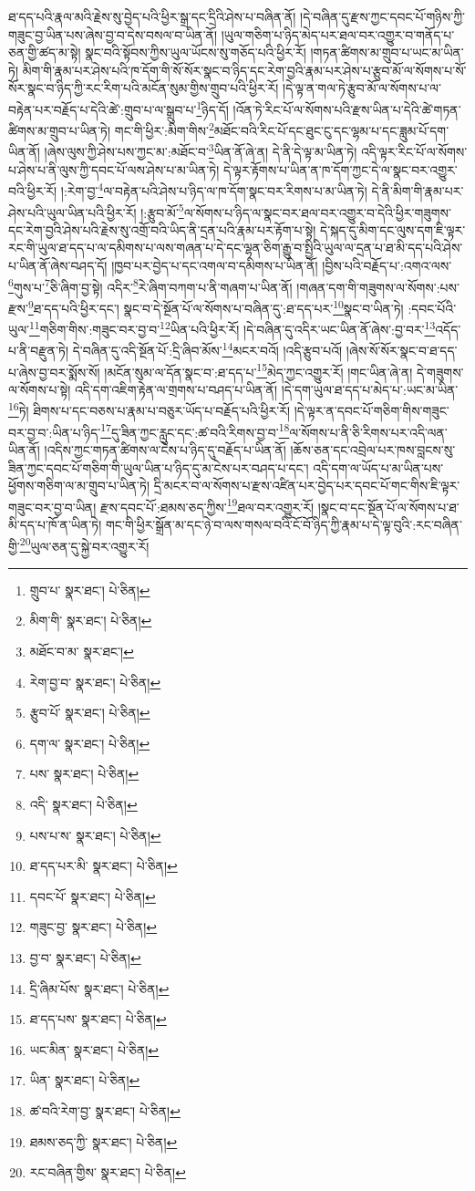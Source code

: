 ཐ་དད་པའི་རྣལ་མའི་རྗེས་སུ་བྱེད་པའི་ཕྱིར་སྒྲ་དང་དྲིའི་ཤེས་པ་བཞིན་ནོ། །དེ་བཞིན་དུ་རྫས་ཀྱང་དབང་པོ་གཉིས་ཀྱི་གཟུང་བྱ་ཡིན་པས་ཞེས་བྱ་བ་དེས་བསལ་བ་ཡིན་ནོ། །ཡུལ་གཅིག་པ་ཉིད་མེད་པར་ཐལ་བར་འགྱུར་བ་གནོད་པ་ཅན་གྱི་ཚད་མ་སྟེ། སྣང་བའི་སྟོབས་ཀྱིས་ཡུལ་ཡོངས་སུ་གཅོད་པའི་ཕྱིར་རོ། །གཏན་ཚིགས་མ་གྲུབ་པ་ཡང་མ་ཡིན་ཏེ། མིག་གི་རྣམ་པར་ཤེས་པའི་ཁ་དོག་གི་སོ་སོར་སྣང་བ་ཉིད་དང་རེག་བྱའི་རྣམ་པར་ཤེས་པ་རྩུབ་མོ་ལ་སོགས་པ་སོ་སོར་སྣང་བ་ཉིད་ཀྱི་རང་རིག་པའི་མངོན་སུམ་གྱིས་གྲུབ་པའི་ཕྱིར་རོ། །དེ་ལྟ་ན་གལ་ཏེ་རྩུབ་མོ་ལ་སོགས་པ་ལ་བརྟེན་པར་བརྗོད་པ་དེའི་ཚེ་:གྲུབ་པ་ལ་སྒྲུབ་པ་\footnote{གྲུབ་པ་  སྣར་ཐང་།  པེ་ཅིན། }ཉིད་དོ། །འོན་ཏེ་རིང་པོ་ལ་སོགས་པའི་རྫས་ཡིན་པ་དེའི་ཚེ་གཏན་ཚིགས་མ་གྲུབ་པ་ཡིན་ཏེ། གང་གི་ཕྱིར་:མིག་གིས་\footnote{མིག་གི་  སྣར་ཐང་།  པེ་ཅིན། }མཐོང་བའི་རིང་པོ་དང་ཐུང་ངུ་དང་ལྷམ་པ་དང་ཟླུམ་པོ་དག་ཡིན་ནོ། །ཞེས་ལུས་ཀྱི་ཤེས་པས་ཀྱང་མ་:མཐོང་བ་\footnote{མཐོང་བ་མ་  སྣར་ཐང་། }ཡིན་ནོ་ཞེ་ན། དེ་ནི་དེ་ལྟ་མ་ཡིན་ཏེ། འདི་ལྟར་རིང་པོ་ལ་སོགས་པ་ཤེས་པ་ནི་ལུས་ཀྱི་དབང་པོ་ལས་ཤེས་པ་མ་ཡིན་ཏེ། དེ་ལྟར་རྟོགས་པ་ཡིན་ན་ཁ་དོག་ཀྱང་དེ་ལ་སྣང་བར་འགྱུར་བའི་ཕྱིར་རོ། །:རེག་བྱ་\footnote{རེག་བྱ་བ་  སྣར་ཐང་།  པེ་ཅིན། }ལ་བརྟེན་པའི་ཤེས་པ་ཉིད་ལ་ཁ་དོག་སྣང་བར་རིགས་པ་མ་ཡིན་ཏེ། དེ་ནི་མིག་གི་རྣམ་པར་ཤེས་པའི་ཡུལ་ཡིན་པའི་ཕྱིར་རོ། །:རྩུབ་མོ་\footnote{རྩུབ་པོ་  སྣར་ཐང་།  པེ་ཅིན། }ལ་སོགས་པ་ཉིད་ལ་སྣང་བར་ཐལ་བར་འགྱུར་བ་དེའི་ཕྱིར་གཟུགས་དང་རེག་བྱའི་ཤེས་པའི་རྗེས་སུ་འགྲོ་བའི་ཡིད་ནི་དྲན་པའི་རྣམ་པར་རྟོག་པ་སྟེ། དེ་སྐད་དུ་མིག་དང་ལུས་དག་ཇི་ལྟར་རང་གི་ཡུལ་ཐ་དད་པ་ལ་དམིགས་པ་ལས་གཞན་པ་དེ་དང་ལྷན་ཅིག་རྒྱུ་བ་སྤྱིའི་ཡུལ་ལ་དྲན་པ་ཐ་མི་དད་པའི་ཤེས་པ་ཡིན་ནོ་ཞེས་བཤད་དོ། །ཁྱབ་པར་བྱེད་པ་དང་འགལ་བ་དམིགས་པ་ཡིན་ནོ། །བྱིས་པའི་བརྗོད་པ་:འགའ་ལས་\footnote{དག་ལ་  སྣར་ཐང་།  པེ་ཅིན། }གུས་པ་\footnote{པས་  སྣར་ཐང་།  པེ་ཅིན། }ཅི་ཞིག་བྱ་སྟེ། འདིར་\footnote{འདི་  སྣར་ཐང་།  པེ་ཅིན། }རེ་ཞིག་བཀག་པ་ནི་གཞག་པ་ཡིན་ནོ། །གཞན་དག་གི་གཟུགས་ལ་སོགས་:པས་རྫས་\footnote{པས་པ་ས་  སྣར་ཐང་།  པེ་ཅིན། }ཐ་དད་པའི་ཕྱིར་དང་། སྣང་བ་དེ་སྔོན་པོ་ལ་སོགས་པ་བཞིན་དུ་:ཐ་དད་པར་\footnote{ཐ་དད་པར་མི་  སྣར་ཐང་།  པེ་ཅིན། }སྣང་བ་ཡིན་ཏེ། :དབང་པོའི་ཡུལ་\footnote{དབང་པོ་  སྣར་ཐང་།  པེ་ཅིན། }གཅིག་གིས་:གཟུང་བར་བྱ་བ་\footnote{གཟུང་བྱ་  སྣར་ཐང་།  པེ་ཅིན། }ཡིན་པའི་ཕྱིར་རོ། །དེ་བཞིན་དུ་འདིར་ཡང་ཡིན་ནོ་ཞེས་:བྱ་བར་\footnote{བྱ་བ་  སྣར་ཐང་།  པེ་ཅིན། }འདོད་པ་ནི་བརྫུན་ཏེ། དེ་བཞིན་དུ་འདི་སྔོན་པོ་:དྲི་ཞིབ་མོས་\footnote{དྲི་ཞིམ་པོས་  སྣར་ཐང་།  པེ་ཅིན། }མངར་བའོ། །འདི་རྩུབ་པའོ། །ཞེས་སོ་སོར་སྣང་བ་ཐ་དད་པ་ཞེས་བྱ་བར་སྨོས་སོ། །མངོན་སུམ་ལ་དོན་སྣང་བ་:ཐ་དད་པ་\footnote{ཐ་དད་པས་  སྣར་ཐང་།  པེ་ཅིན། }མེད་ཀྱང་འགྱུར་རོ། །གང་ཡིན་ཞེ་ན། དེ་གཟུགས་ལ་སོགས་པ་སྟེ། འདི་དག་འཇིག་རྟེན་ལ་གྲགས་པ་བཤད་པ་ཡིན་ནོ། །དེ་དག་ཡུལ་ཐ་དད་པ་མེད་པ་:ཡང་མ་ཡིན་\footnote{ཡང་མིན་  སྣར་ཐང་།  པེ་ཅིན། }ཏེ། ཐིགས་པ་དང་བཅས་པ་རྣམ་པ་བཅུར་ཡོད་པ་བརྗོད་པའི་ཕྱིར་རོ། །དེ་ལྟར་ན་དབང་པོ་གཅིག་གིས་གཟུང་བར་བྱ་བ་:ཡིན་པ་ཉིད་\footnote{ཡིན་  སྣར་ཐང་།  པེ་ཅིན། }དུ་ཟིན་ཀྱང་རླུང་དང་:ཚ་བའི་རིགས་བྱ་བ་\footnote{ཚ་བའི་རེག་བྱ་  སྣར་ཐང་།  པེ་ཅིན། }ལ་སོགས་པ་ནི་ཅི་རིགས་པར་འདི་ལན་ཡིན་ནོ། །འདིས་ཀྱང་གཏན་ཚིགས་ལ་ངེས་པ་ཉིད་དུ་བརྗོད་པ་ཡིན་ནོ། །ཆོས་ཅན་དང་འབྲེལ་པར་ཁས་བླངས་སུ་ཟིན་ཀྱང་དབང་པོ་གཅིག་གི་ཡུལ་ཡིན་པ་ཉིད་དུ་མ་ངེས་པར་བཤད་པ་དང་། འདི་དག་ལ་ཡོད་པ་མ་ཡིན་པས་ཕྱོགས་གཅིག་ལ་མ་གྲུབ་པ་ཡིན་ཏེ། དྲི་མངར་བ་ལ་སོགས་པ་རྫས་འཛིན་པར་བྱེད་པར་དབང་པོ་གང་གིས་ཇི་ལྟར་གཟུང་བར་བྱ་བ་ཡིན། རྫས་དབང་པོ་:ཐམས་ཅད་ཀྱིས་\footnote{ཐམས་ཅད་ཀྱི་  སྣར་ཐང་།  པེ་ཅིན། }ཐལ་བར་འགྱུར་རོ། །སྣང་བ་དང་སྔོན་པོ་ལ་སོགས་པ་ཐ་མི་དད་པ་ཁོ་ན་ཡིན་ཏེ། གང་གི་ཕྱིར་སྒྲོན་མ་དང་ཉེ་བ་ལས་གསལ་བའི་ངོ་བོ་ཉིད་ཀྱི་རྣམ་པ་དེ་ལྟ་བུའི་:རང་བཞིན་གྱི་\footnote{རང་བཞིན་གྱིས་  སྣར་ཐང་།  པེ་ཅིན། }ཡུལ་ཅན་དུ་སྐྱེ་བར་འགྱུར་རོ། 